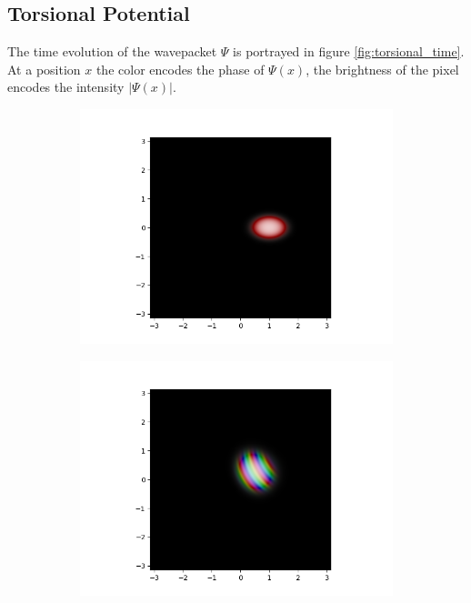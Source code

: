 \documentclass{article}
\begin{document}
\begin{appendices}
\subsection{Torsional Potential}
The time evolution of the wavepacket $\Psi$ is portrayed in figure \ref{fig:torsional_time}. At a position $x$ the color encodes the phase of $\Psi(x)$, the brightness of the pixel encodes the intensity $\lvert \Psi(x) \rvert$.
\begin{figure}[h]
  \begin{subfigure}[b]{0.5 \textwidth}
    \includegraphics[width = \textwidth]{graphics/torsional/wavefunction_contour_block_0_level_0_timestep_0000000.PNG}
  \end{subfigure}
  \hfill
  \begin{subfigure}[b]{0.5 \textwidth}
    \includegraphics[width = \textwidth]{graphics/torsional/wavefunction_contour_block_0_level_0_timestep_0000100.PNG}

\end{subfigure}
\end{figure}
\end{appendices}
\end{document}
